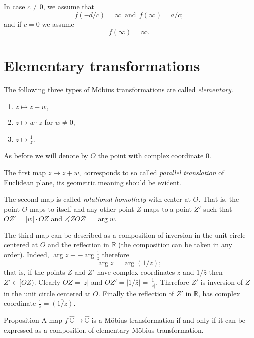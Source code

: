 In case $c\not=0$, we assume that
$$f(-d/c) = \infty\ \  \text{and}\ \  f(\infty) = a/c;$$
and if $c=0$ we assume
$$f(\infty) = \infty.$$





\section*{Elementary transformations}

The following three types of M\"obius transformations are called \emph{elementary}.

\begin{enumerate}
\item $z\mapsto z+w,$
\item $z\mapsto w\cdot z$ for $w\ne0,$
\item $z\mapsto \frac1z.$
\end{enumerate}
 
As before we will denote by $O$ the point with complex coordinate $0$.

The first map $z\mapsto z+w,$ corresponds to so called 
\emph{parallel translation} 
of Euclidean plane, its geometric meaning should be evident.

The second map is called \emph{rotational homothety} with center at $O$.
That is, the point $O$ maps to itself
and any other point $Z$ maps to a point $Z'$ such that $OZ'=|w|\cdot OZ$ and $\measuredangle ZOZ'=\arg w$.

The third map can be described as a composition of inversion in the unit circle centered at $O$ and the reflection in $\mathbb{R}$ 
(the composition can be taken in any order).
Indeed, $\arg z\equiv -\arg \tfrac1z$ therefore 
$$\arg z=\arg (1/\bar z);$$
that is, if the points $Z$ and $Z'$ have complex coordinates $z$ and $1/\bar z$
then $Z'\in[OZ)$.
Clearly $OZ=|z|$ and $OZ'=|1/\bar z|=\tfrac{1}{|z|}$.
Therefore $Z'$ is inversion of $Z$ in the unit circle centered at $O$.
Finally the reflection of $Z'$ in $\mathbb{R}$, 
has complex coordinate $\tfrac1z=\overline{(1/\bar z)}$.

\begin{thm}{Proposition}\label{prop:mob-comp}
A map $f\:\hat{\mathbb{C}}\to\hat{\mathbb{C}}$ is a M\"obius transformation if and only if it can be expressed as a composition of elementary   M\"obius transformation. 
\end{thm}

